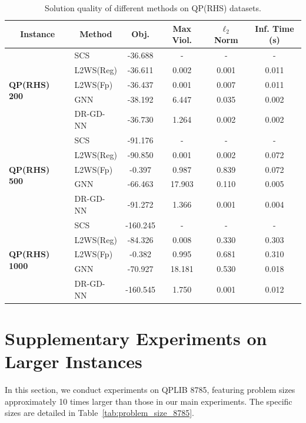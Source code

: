 \documentclass[10pt]{article} %
\begin{document}
\begin{table}[h]
\centering
\caption{Solution quality of different methods on QP(RHS) datasets.}
\label{tab:sol_quality_baseline}
	\begin{tabular}{@{}l| l| c c c c}
	\toprule
       \multicolumn{1}{c}{\bf Instance} & \multicolumn{1}{c}{\bf Method} & \multicolumn{1}{c}{\bf Obj.} &\multicolumn{1}{c}{\bf Max Viol.} &\multicolumn{1}{c}{\bf $\ell_2$ Norm} &\multicolumn{1}{c}{\bf Inf. Time (s)} \\
        \midrule
        \multirow{5}{*}{\textbf{QP(RHS) 200}}
        &SCS &   -36.688&  -  & - &-\\
        &L2WS(Reg) & -36.611  & 0.002   & 0.001 &0.011\\
        &L2WS(Fp) & -36.437  & 0.001 &0.007 &0.011\\
        &GNN & -38.192 & 6.447  &0.035 &0.002\\
        &DR-GD-NN & -36.730 & 1.264   & 0.002&0.002\\
        \midrule
        \multirow{5}{*}{\textbf{QP(RHS) 500}}
        &SCS &  -91.176 & -  & - &-\\
        &L2WS(Reg) & -90.850 & 0.001   &0.002&0.072\\
        &L2WS(Fp) & -0.397  & 0.987 &0.839&0.072\\
        &GNN & -66.463 & 17.903   &0.110 &0.005\\
        &DR-GD-NN & -91.272 & 1.366   &0.001 &0.004\\
        \midrule
        \multirow{5}{*}{\textbf{QP(RHS) 1000}}
        &SCS & -160.245  & -    & - &-\\
        &L2WS(Reg) & -84.326 & 0.008  &0.330 &0.303\\
        &L2WS(Fp) & -0.382  & 0.995 &0.681 &0.310\\
        &GNN &  -70.927 & 18.181 &0.530 &0.018\\
        &DR-GD-NN & -160.545 & 1.750 & 0.001 &0.012\\
	\bottomrule
	\end{tabular}
\end{table}

\clearpage
\newpage
\section{Supplementary Experiments on Larger Instances}
In this section, we conduct experiments on QPLIB 8785, featuring problem sizes approximately 10 times larger than those in our main experiments. The specific sizes are detailed in Table~\ref{tab:problem_size_8785}.
\end{document}
